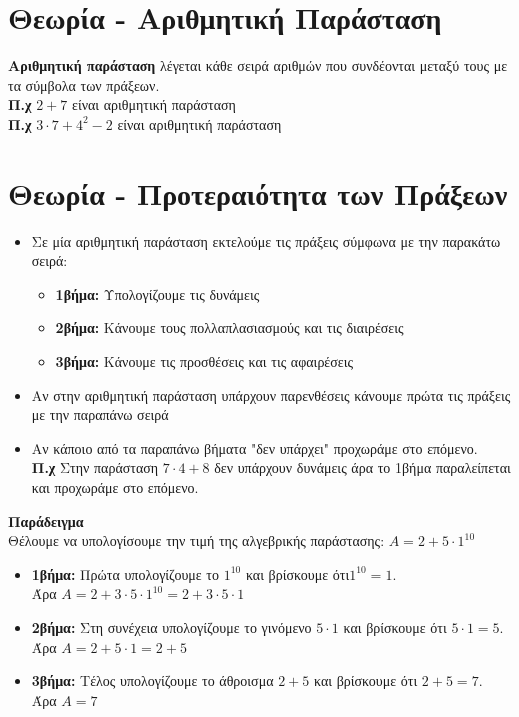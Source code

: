 \documentclass[a4paper,10pt]{report}
\begin{document}
\section*{Θεωρία - Αριθμητική Παράσταση \hfill \small{}}
\textbf{Αριθμητική παράσταση} λέγεται κάθε σειρά αριθμών που συνδέονται μεταξύ τους με τα σύμβολα των πράξεων.\\
\textbf{Π.χ} $2+7$ είναι αριθμητική παράσταση\\
\textbf{Π.χ} $3\cdot7+4^{2}-2$ είναι αριθμητική παράσταση


\section*{Θεωρία - Προτεραιότητα των Πράξεων  \hfill \small{}}
\begin{itemize}
 \item Σε μία αριθμητική παράσταση εκτελούμε τις πράξεις σύμφωνα με την παρακάτω σειρά:
       \begin{itemize}
        \item \textbf{1\textdegree  βήμα:} Υπολογίζουμε τις δυνάμεις
        \item \textbf{2\textdegree  βήμα:} Κάνουμε τους πολλαπλασιασμούς και τις διαιρέσεις
        \item \textbf{3\textdegree  βήμα:} Κάνουμε τις προσθέσεις και τις αφαιρέσεις
       \end{itemize}
 \item Αν στην αριθμητική παράσταση υπάρχουν παρενθέσεις κάνουμε πρώτα τις πράξεις με την παραπάνω σειρά
 \item Αν κάποιο από τα παραπάνω βήματα "δεν υπάρχει" προχωράμε στο επόμενο.\\
       \textbf{Π.χ } Στην παράσταση $7\cdot4+8$ δεν υπάρχουν δυνάμεις άρα το 1\textdegree  βήμα παραλείπεται 
        και προχωράμε στο επόμενο.
\end{itemize}
\textbf{Παράδειγμα}\\
Θέλουμε να υπολογίσουμε την τιμή της αλγεβρικής παράστασης: $Α=2+5\cdot 1^{10}$
 \begin{itemize}
        \item \textbf{1\textdegree  βήμα:} Πρώτα υπολογίζουμε το $1^{10}$ και βρίσκουμε ότι$1^{10}=1$.\\
               Άρα $Α=2+3\cdot5\cdot 1^{10}=2+3\cdot5\cdot1$
        \item \textbf{2\textdegree  βήμα:} Στη συνέχεια υπολογίζουμε το γινόμενο $5\cdot1$ και βρίσκουμε ότι 
         $5\cdot1=5$.\\
          Άρα $Α=2+5\cdot1=2+5$
        \item \textbf{3\textdegree  βήμα:} Τέλος υπολογίζουμε το άθροισμα $2+5$ και βρίσκουμε ότι $2+5=7$.\\
         Άρα $Α=7$
\end{itemize}
\end{document}
